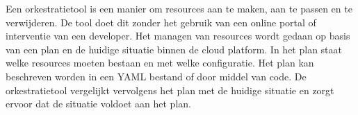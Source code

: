 Een orkestratietool is een manier om resources aan te maken, aan te passen en te verwijderen. De tool doet dit zonder het gebruik van een online portal of interventie van een developer. Het managen van resources wordt gedaan op basis van een plan en de huidige situatie binnen de cloud platform. In het plan staat welke resources moeten bestaan en met welke configuratie. Het plan kan beschreven worden in een YAML bestand of door middel van code. De orkestratietool vergelijkt vervolgens het plan met de huidige situatie en zorgt ervoor dat de situatie voldoet aan het plan.